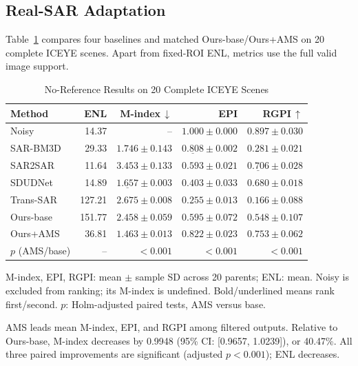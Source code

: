 \documentclass[journal]{IEEEtran}
\newcommand{\rev}[1]{{\color{RevisionBlue}#1}}
\newcommand{\rev}[1]{#1}
\begin{document}
\subsection{Real-SAR Adaptation}
\rev{Table~\ref{tab:real} compares four baselines and matched Ours-base/Ours+AMS on 20 complete ICEYE scenes. Apart from fixed-ROI ENL, metrics use the full valid image support.}

\begin{table}[!t]
\caption{\rev{No-Reference Results on 20 Complete ICEYE Scenes}}
\label{tab:real}
\centering
\footnotesize
\setlength{\tabcolsep}{1.1pt}
\renewcommand{\arraystretch}{1.04}
\rev{\begin{tabular*}{\columnwidth}{@{\extracolsep{\fill}}lrrrr@{}}
\toprule
\textbf{Method} & \textbf{ENL} & \textbf{M-index}\,$\downarrow$ & \textbf{EPI} & \textbf{RGPI}\,$\uparrow$ \\
\midrule
Noisy & 14.37 & -- & \(1.000{\pm}0.000\) & \(0.897{\pm}0.030\) \\
SAR-BM3D & 29.33 & \(1.746{\pm}0.143\) & \(\underline{0.808}{\pm}0.002\) & \(0.281{\pm}0.021\) \\
SAR2SAR & 11.64 & \(3.453{\pm}0.133\) & \(0.593{\pm}0.021\) & \(\underline{0.706}{\pm}0.028\) \\
SDUDNet & 14.89 & \(\underline{1.657}{\pm}0.003\) & \(0.403{\pm}0.033\) & \(0.680{\pm}0.018\) \\
Trans-SAR & 127.21 & \(2.675{\pm}0.008\) & \(0.255{\pm}0.013\) & \(0.166{\pm}0.088\) \\
Ours-base & 151.77 & \(2.458{\pm}0.059\) & \(0.595{\pm}0.072\) & \(0.548{\pm}0.107\) \\
Ours+AMS & 36.81 & \(\mathbf{1.463}{\pm}0.013\) & \(\mathbf{0.822}{\pm}0.023\) & \(\mathbf{0.753}{\pm}0.062\) \\
\midrule
\(p\) (AMS/base) & -- & \(<0.001\) & \(<0.001\) & \(<0.001\) \\
\bottomrule
\end{tabular*}}
\vspace{1pt}
\parbox{\columnwidth}{\footnotesize\rev{M-index, EPI, RGPI: mean \(\pm\) sample SD across 20 parents; ENL: mean. Noisy is excluded from ranking; its M-index is undefined. Bold/underlined means rank first/second. \(p\): Holm-adjusted paired tests, AMS versus base.}}
\end{table}

\rev{AMS leads mean M-index, EPI, and RGPI among filtered outputs. Relative to Ours-base, M-index decreases by 0.9948 (95\% CI: [0.9657, 1.0239]), or 40.47\%. All three paired improvements are significant (adjusted \(p<0.001\)); ENL decreases.}
\end{document}
